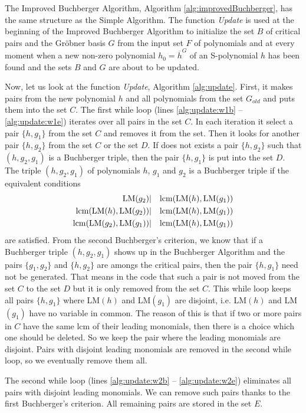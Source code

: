 The Improved Buchberger Algorithm, Algorithm \ref{alg:improvedBuchberger}, has the same structure as the Simple Algorithm. The function \textit{Update} is used at the beginning of the Improved Buchberger Algorithm to initialize the set $B$ of critical pairs and the Gr\"obner basis $G$ from the input set $F$ of polynomials and at every moment when a new non-zero polynomial $h_0 = \overline{h}^G$ of an S-polynomial $h$ has been found and the sets $B$ and $G$ are about to be updated.



Now, let us look at the function \textit{Update}, Algorithm \ref{alg:update}. First, it makes pairs from the new polynomial $h$ and all polynomials from the set $G_{old}$ and puts them into the set $C$. The first while loop (lines \ref{alg:update:w1b} -- \ref{alg:update:w1e}) iterates over all pairs in the set $C$. In each iteration it select a pair $\{h, g_1\}$ from the set $C$ and removes it from the set. Then it looks for another pair $\{h, g_2\}$ from the set $C$ or the set $D$. If does not exists a pair $\{h, g_2\}$ such that $(h, g_2, g_1)$ is a Buchberger triple, then the pair $\{h, g_1\}$ is put into the set $D$. The triple $(h, g_2, g_1)$ of polynomials $h$, $g_1$ and $g_2$ is a Buchberger triple if the equivalent conditions 
\begin{eqnarray}
	\operatorname{LM}(g_2) &|& \operatorname{lcm}(\operatorname{LM}(h), \operatorname{LM}(g_1))\\
	\operatorname{lcm}(\operatorname{LM}(h), \operatorname{LM}(g_2) ) &|& \operatorname{lcm}(\operatorname{LM}(h), \operatorname{LM}(g_1))\\
	\operatorname{lcm}(\operatorname{LM}(g_2), \operatorname{LM}(g_1)) &|& \operatorname{lcm}(\operatorname{LM}(h), \operatorname{LM}(g_1))
\end{eqnarray}
are satisfied. From the second Buchberger's criterion, we know that if a Buchberger triple $(h, g_2, g_1)$ shows up in the Buchberger Algorithm and the pairs $\{g_1, g_2\}$ and $\{h, g_2\}$ are amongs the critical pairs, then the pair $\{h, g_1\}$ need not be generated. That means in the code that such a pair is not moved from the set $C$ to the set $D$ but it is only removed from the set $C$. This while loop keeps all pairs $\{h, g_1\}$ where LM$(h)$ and LM$(g_1)$ are disjoint, i.e. LM$(h)$ and LM$(g_1)$ have no variable in common. The reason of this is that if two or more pairs in $C$ have the same lcm of their leading monomials, then there is a choice which one should be deleted. So we keep the pair where the leading monomials are disjoint. Pairs with disjoint leading monomials are removed in the second while loop, so we eventually remove them all.

The second while loop (lines \ref{alg:update:w2b} -- \ref{alg:update:w2e}) eliminates all pairs with disjoint leading monomials. We can remove such pairs thanks to the first Buchberger's criterion. All remaining pairs are stored in the set $E$.


